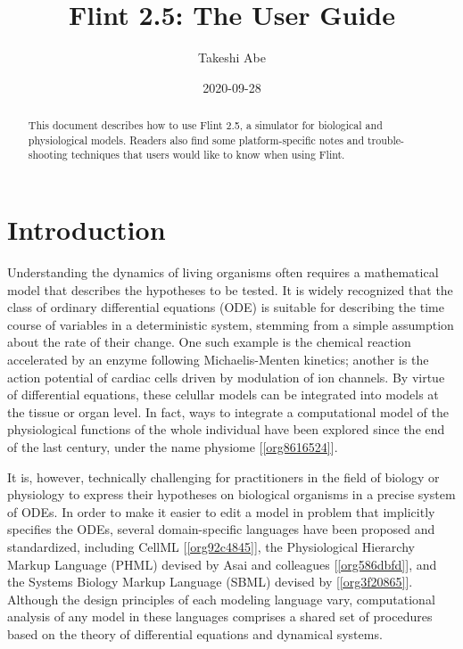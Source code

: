 \documentclass[a4paper,10pt]{report}
\author{Takeshi Abe}
\date{2020-09-28}
\title{Flint 2.5: The User Guide}
\begin{document}
\maketitle
\tableofcontents

\vfill

\doclicenseThis

\begin{abstract}
This document describes how to use Flint 2.5, a simulator for biological and physiological models.
Readers also find some platform-specific notes and trouble-shooting techniques that
users would like to know when using Flint.
\end{abstract}

\chapter{Introduction}
\label{sec:orga576558}

Understanding the dynamics of living organisms often requires a mathematical model
that describes the hypotheses to be tested. It is widely recognized that the
class of ordinary differential equations (ODE) is suitable for describing the
time course of variables in a deterministic system, stemming from a simple
assumption about the rate of their change.
One such example is the chemical reaction accelerated by an enzyme
following Michaelis-Menten kinetics; another is the action potential of
cardiac cells driven by modulation of ion channels. By virtue of
differential equations, these celullar models can be integrated into models at the
tissue or organ level. In fact, ways to integrate a computational model of
the physiological functions of the whole individual have been explored since the
end of the last century, under the name physiome [\ref{org8616524}].

It is, however, technically challenging for practitioners in the field of
biology or physiology to express their hypotheses on biological organisms in a
precise system of ODEs. In order to make it easier to edit a model in problem
that implicitly specifies the ODEs, several domain-specific languages have
been proposed and standardized, including CellML [\ref{org92c4845}], the
Physiological Hierarchy Markup Language (PHML) devised by Asai and colleagues
[\ref{org586dbfd}], and the Systems Biology Markup Language (SBML) devised
by [\ref{org3f20865}]. Although the design principles of each modeling
language vary, computational analysis of any model in these languages
comprises a shared set of procedures based on the theory of differential
equations and dynamical systems.
\end{document}
